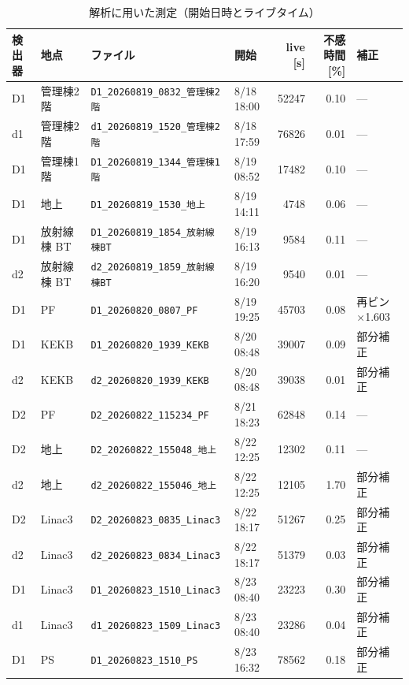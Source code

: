 \documentclass[a4paper,11pt]{ltjsarticle}
\begin{document}
\begin{table}[htbp]
  \centering
  \caption{解析に用いた測定（開始日時とライブタイム）}
  \label{tab:runs}
  \scriptsize
  \begin{tabular}{llllrrl}
    \toprule
    検出器 & 地点 & ファイル & 開始 & live [s] & 不感時間 [\%] & 補正 \\
    \midrule
    D1 & 管理棟2階 & \texttt{D1\_20260819\_0832\_管理棟2階} & 8/18 18:00 & 52247 & 0.10 & --- \\
    d1 & 管理棟2階 & \texttt{d1\_20260819\_1520\_管理棟2階} & 8/18 17:59 & 76826 & 0.01 & --- \\
    D1 & 管理棟1階 & \texttt{D1\_20260819\_1344\_管理棟1階} & 8/19 08:52 & 17482 & 0.10 & --- \\
    D1 & 地上 & \texttt{D1\_20260819\_1530\_地上} & 8/19 14:11 & 4748 & 0.06 & --- \\
    D1 & 放射線棟 BT & \texttt{D1\_20260819\_1854\_放射線棟BT} & 8/19 16:13 & 9584 & 0.11 & --- \\
    d2 & 放射線棟 BT & \texttt{d2\_20260819\_1859\_放射線棟BT} & 8/19 16:20 & 9540 & 0.01 & --- \\
    D1 & PF & \texttt{D1\_20260820\_0807\_PF} & 8/19 19:25 & 45703 & 0.08 & 再ビン×1.603 \\
    D1 & KEKB & \texttt{D1\_20260820\_1939\_KEKB} & 8/20 08:48 & 39007 & 0.09 & 部分補正 \\
    d2 & KEKB & \texttt{d2\_20260820\_1939\_KEKB} & 8/20 08:48 & 39038 & 0.01 & 部分補正 \\
    D2 & PF & \texttt{D2\_20260822\_115234\_PF} & 8/21 18:23 & 62848 & 0.14 & --- \\
    D2 & 地上 & \texttt{D2\_20260822\_155048\_地上} & 8/22 12:25 & 12302 & 0.11 & --- \\
    d2 & 地上 & \texttt{d2\_20260822\_155046\_地上} & 8/22 12:25 & 12105 & 1.70 & 部分補正 \\
    D2 & Linac3 & \texttt{D2\_20260823\_0835\_Linac3} & 8/22 18:17 & 51267 & 0.25 & 部分補正 \\
    d2 & Linac3 & \texttt{d2\_20260823\_0834\_Linac3} & 8/22 18:17 & 51379 & 0.03 & 部分補正 \\
    D1 & Linac3 & \texttt{D1\_20260823\_1510\_Linac3} & 8/23 08:40 & 23223 & 0.30 & 部分補正 \\
    d1 & Linac3 & \texttt{d1\_20260823\_1509\_Linac3} & 8/23 08:40 & 23286 & 0.04 & 部分補正 \\
    D1 & PS & \texttt{D1\_20260823\_1510\_PS} & 8/23 16:32 & 78562 & 0.18 & 部分補正 \\

\end{tabular}
\end{table}
\end{document}
